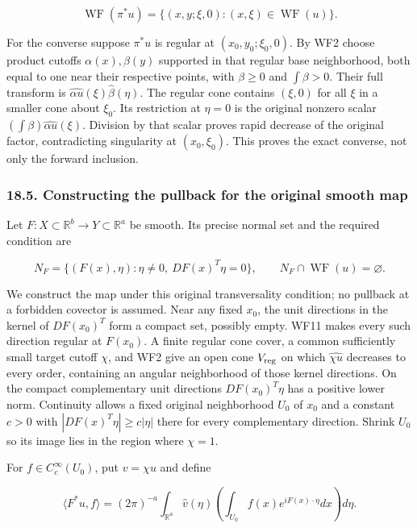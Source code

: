 \documentclass[
  11pt,
]{article}
\begin{document}
\[
\operatorname{WF}(\pi^*u)
 =\{(x,y;\xi,0):(x,\xi)\in\operatorname{WF}(u)\}.
\tag{WF10}
\]

For the converse suppose \(\pi^*u\) is regular at \((x_0,y_0;\xi_0,0)\).
By WF2 choose product cutoffs \(\alpha(x),\beta(y)\) supported in that
regular base neighborhood, both equal to one near their respective
points, with \(\beta\geq0\) and \(\int\beta>0\). Their full transform is
\(\widehat{\alpha u}(\xi)\widehat\beta(\eta)\). The regular cone
contains \((\xi,0)\) for all \(\xi\) in a smaller cone about \(\xi_0\).
Its restriction at \(\eta=0\) is the original nonzero scalar
\((\int\beta)\widehat{\alpha u}(\xi)\). Division by that scalar proves
rapid decrease of the original factor, contradicting singularity at
\((x_0,\xi_0)\). This proves the exact converse, not only the forward
inclusion.

\subsubsection{18.5. Constructing the pullback for the original smooth
map}\label{constructing-the-pullback-for-the-original-smooth-map}

Let \(F:X\subset\mathbb R^b\to Y\subset\mathbb R^a\) be smooth. Its
precise normal set and the required condition are

\[
N_F=\{(F(x),\eta):\eta\ne0,\ DF(x)^T\eta=0\},
\qquad N_F\cap\operatorname{WF}(u)=\varnothing.
\tag{WF11}
\]

We construct the map under this original transversality condition; no
pullback at a forbidden covector is assumed. Near any fixed \(x_0\), the
unit directions in the kernel of \(DF(x_0)^T\) form a compact set,
possibly empty. WF11 makes every such direction regular at \(F(x_0)\). A
finite regular cone cover, a common sufficiently small target cutoff
\(\chi\), and WF2 give an open cone \(V_{\rm reg}\) on which
\(\widehat{\chi u}\) decreases to every order, containing an angular
neighborhood of those kernel directions. On the compact complementary
unit directions \(DF(x_0)^T\eta\) has a positive lower norm. Continuity
allows a fixed original neighborhood \(U_0\) of \(x_0\) and a constant
\(c>0\) with \(|DF(x)^T\eta|\geq c|\eta|\) there for every complementary
direction. Shrink \(U_0\) so its image lies in the region where
\(\chi=1\).

For \(f\in C_c^\infty(U_0)\), put \(v=\chi u\) and define

\[
\langle F^*u,f\rangle
=(2\pi)^{-a}\int_{\mathbb R^a}\widehat v(\eta)
                   \left(\int_{U_0}f(x)e^{iF(x)\cdot\eta}dx\right)d\eta.
\tag{WF12}
\]
\end{document}
